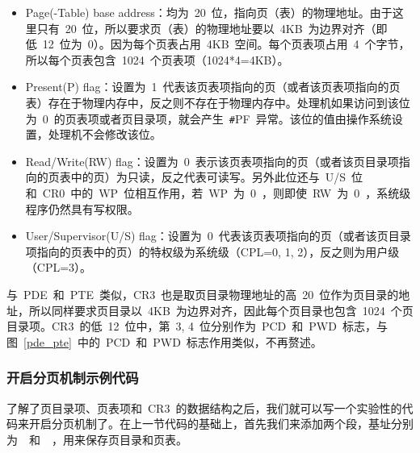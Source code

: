 
\begin{itemize}
\item Page(-Table) base address：均为~20~位，指向页（表）的物理地址。由于这里只有~20~位，所以要求页（表）的物理地址要以~4KB~为边界对齐（即低~12~位为~0）。因为每个页表占用~4KB~空间。每个页表项占用~4~个字节，所以每个页表包含~1024~个页表项（1024*4=4KB）。
\item Present(P) flag：设置为~1~代表该页表项指向的页（或者该页表项指向的页表）存在于物理内存中，反之则不存在于物理内存中。处理机如果访问到该位为~0~的页表项或者页目录项，就会产生~\texttt{\#}PF~异常。该位的值由操作系统设置，处理机不会修改该位。
\item Read/Write(RW) flag：设置为~0~表示该页表项指向的页（或者该页目录项指向的页表中的页）为只读，反之代表可读写。另外此位还与~U/S~位和~CR0~中的~WP~位相互作用，若~WP~为~0~，则即使~RW~为~0~，系统级程序仍然具有写权限。
\item User/Supervisor(U/S) flag：设置为~0~代表该页表项指向的页（或者该页目录项指向的页表中的页）的特权级为系统级（CPL=0, 1, 2），反之则为用户级（CPL=3）。
\end{itemize}

与~PDE~和~PTE~类似，CR3~也是取页目录物理地址的高~20~位作为页目录的地址，所以同样要求页目录以~4KB~为边界对齐，因此每个页目录也包含~1024~个页目录项。CR3~的低~12~位中，第~3, 4~位分别作为~PCD~和~PWD~标志，与图~\ref{pde_pte}~中的~PCD~和~PWD~标志作用类似，不再赘述。

\subsubsection{开启分页机制示例代码}

了解了页目录项、页表项和~CR3~的数据结构之后，我们就可以写一个实验性的代码来开启分页机制了。在上一节代码的基础上，首先我们来添加两个段，基址分别为~~和~~，用来保存页目录和页表。


